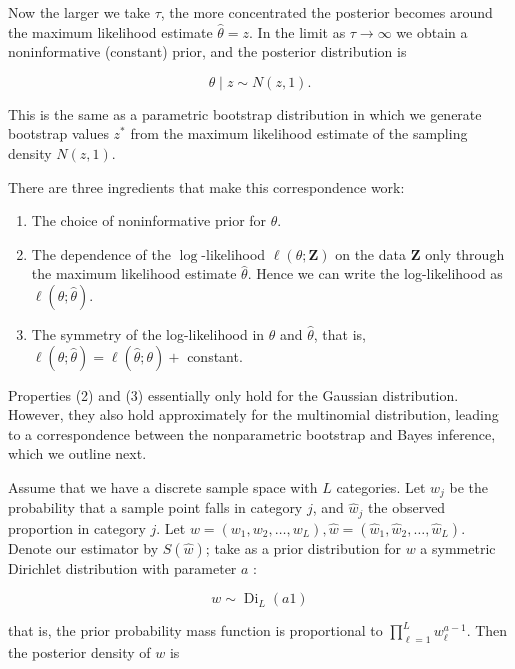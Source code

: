 \documentclass[10pt]{article}
\begin{document}
Now the larger we take $\tau$, the more concentrated the posterior becomes around the maximum likelihood estimate $\hat{\theta}=z$. In the limit as $\tau \rightarrow \infty$ we obtain a noninformative (constant) prior, and the posterior distribution is


\begin{equation*}
\theta \mid z \sim N(z, 1) . \tag{8.31}
\end{equation*}


This is the same as a parametric bootstrap distribution in which we generate bootstrap values $z^{*}$ from the maximum likelihood estimate of the sampling density $N(z, 1)$.

There are three ingredients that make this correspondence work:

\begin{enumerate}
  \item The choice of noninformative prior for $\theta$.
  \item The dependence of the $\log$-likelihood $\ell(\theta ; \mathbf{Z})$ on the data $\mathbf{Z}$ only through the maximum likelihood estimate $\hat{\theta}$. Hence we can write the log-likelihood as $\ell(\theta ; \hat{\theta})$.
  \item The symmetry of the log-likelihood in $\theta$ and $\hat{\theta}$, that is, $\ell(\theta ; \hat{\theta})= \ell(\hat{\theta} ; \theta)+$ constant.
\end{enumerate}

Properties (2) and (3) essentially only hold for the Gaussian distribution. However, they also hold approximately for the multinomial distribution, leading to a correspondence between the nonparametric bootstrap and Bayes inference, which we outline next.

Assume that we have a discrete sample space with $L$ categories. Let $w_{j}$ be the probability that a sample point falls in category $j$, and $\hat{w}_{j}$ the observed proportion in category $j$. Let $w=\left(w_{1}, w_{2}, \ldots, w_{L}\right), \hat{w}=\left(\hat{w}_{1}, \hat{w}_{2}, \ldots, \hat{w}_{L}\right)$. Denote our estimator by $S(\hat{w})$; take as a prior distribution for $w$ a symmetric Dirichlet distribution with parameter $a$ :


\begin{equation*}
w \sim \operatorname{Di}_{L}(a 1) \tag{8.32}
\end{equation*}


that is, the prior probability mass function is proportional to $\prod_{\ell=1}^{L} w_{\ell}^{a-1}$. Then the posterior density of $w$ is
\end{document}
